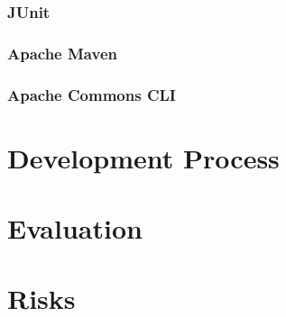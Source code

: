 \documentclass[11pt, a4paper]{article}
\begin{document}
\subsubsection{JUnit}
\label{sub:junit}

\subsubsection{Apache Maven}
\label{sub:maven}

\subsubsection{Apache Commons CLI}
\label{sub:commons_cli}


\section{Development Process} %
\label{sec:development_process}

\section{Evaluation} %
\label{sec:evaluation}

\section{Risks} %
\label{sec:risks}
\end{document}
